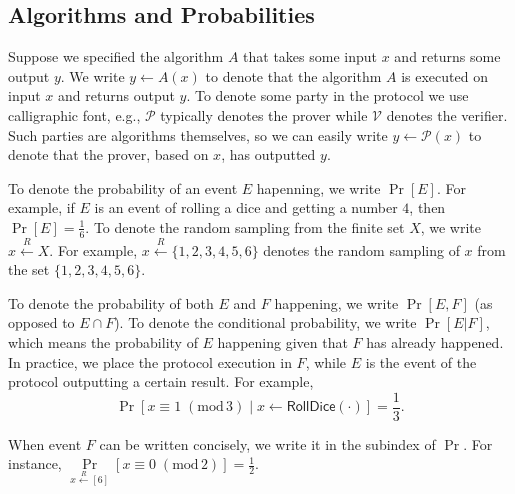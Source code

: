 \documentclass[../lecture-notes-148x210.tex]{subfiles}
\begin{document}
\subsection*{Algorithms and Probabilities}

Suppose we specified the algorithm $A$ that takes some input $x$ and returns
some output $y$. We write $y \gets A(x)$ to denote that the algorithm $A$ is
executed on input $x$ and returns output $y$. To denote some party in the 
protocol we use calligraphic font, e.g., $\mathcal{P}$ typically denotes 
the prover while $\mathcal{V}$ denotes the verifier. Such parties are algorithms 
themselves, so we can easily write $y \gets \mathcal{P}(x)$ to denote that 
the prover, based on $x$, has outputted $y$.

To denote the probability of an event $E$ hapenning, we write $\Pr[E]$. For
example, if $E$ is an event of rolling a dice and getting a number $4$, then
$\Pr[E] = \frac{1}{6}$. To denote the random sampling from the finite set $X$,
we write $x \xleftarrow{R} X$. For example, $x \xleftarrow{R} \{1,2,3,4,5,6\}$
denotes the random sampling of $x$ from the set $\{1,2,3,4,5,6\}$.

To denote the probability of both $E$ and $F$ happening, we write $\Pr[E,F]$ (as
opposed to $E \cap F$). To denote the conditional probability, we write
$\Pr[E|F]$, which means the probability of $E$ happening given that $F$ has
already happened. In practice, we place the protocol execution in $F$, while $E$
is the event of the protocol outputting a certain result. For example,
\begin{equation*}
    \Pr\left[x \equiv 1 \; (\text{mod}\,3) \;|\; x \gets \mathsf{RollDice}(\cdot)\right] = \frac{1}{3}.
\end{equation*}

When event $F$ can be written concisely, we write it in the subindex of $\Pr$.
For instance, $\underset{x \xleftarrow{R} [6]}{\Pr}[x \equiv 0 \; (\text{mod}\,2)]=\frac{1}{2}$.
\end{document}

